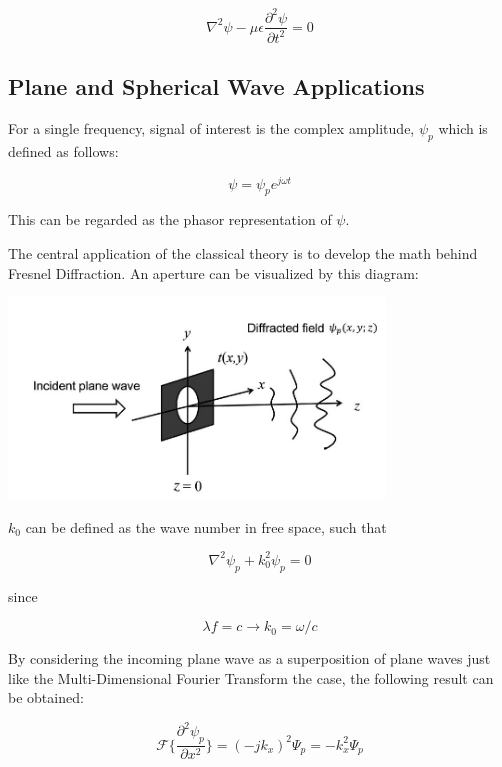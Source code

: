 \documentclass[12pt]{article}
\begin{document}
\begin{equation}
	\nabla^2\psi - \mu\epsilon\frac{\partial^2\psi}{\partial t^2} = 0
\end{equation}

\subsection{Plane and Spherical Wave Applications}

For a single frequency, signal of interest is the complex amplitude, \(\psi_{p}\) which is defined as follows:

\begin{equation}
	\psi = \psi_{p}e^{j \omega t}
\end{equation}

This can be regarded as the phasor representation of \(\psi\).

The central application of the classical theory is to develop the math behind Fresnel Diffraction. An aperture can be visualized by this diagram:
\begin{center}
\includegraphics[width=100mm]{tupac5.png}
\end{center}

\(k_{0}\) can be defined as the wave number in free space, such that

\begin{equation}
	\nabla^2\psi_{p} + k_{0}^2\psi_{p} = 0
\end{equation}

since

\begin{equation}
	\lambda f = c \rightarrow k_{0} = \omega/c
\end{equation}

By considering the incoming plane wave as a superposition of plane waves just like the Multi-Dimensional Fourier Transform the case, the following result can be obtained:

\begin{equation}
	\mathscr{F} \Big\{ \frac{\partial^2 \psi_{p}}{\partial x^2} \Big\} = (-jk_{x})^2\Psi_{p} = -k_{x}^2\Psi_{p}
\end{equation}
\end{document}
